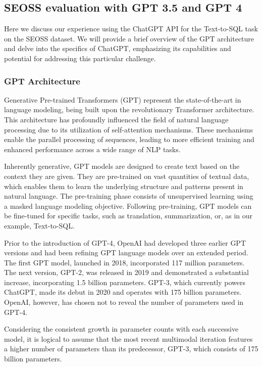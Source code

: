 \subsection{SEOSS evaluation with GPT 3.5 and GPT 4}

Here we discuss our experience using the ChatGPT API for the Text-to-SQL task on the SEOSS dataset. We will provide a brief overview of the GPT architecture and delve into the specifics of ChatGPT, emphasizing its capabilities and potential for addressing this particular challenge.
\subsubsection{GPT Architecture}

Generative Pre-trained Transformers (GPT) \cite{radford2018improving} represent the state-of-the-art in language modeling, being built upon the revolutionary Transformer architecture. This architecture has profoundly influenced the field of natural language processing due to its utilization of self-attention mechanisms. These mechanisms enable the parallel processing of sequences, leading to more efficient training and enhanced performance across a wide range of NLP tasks.

Inherently generative, GPT models are designed to create text based on the context they are given. They are pre-trained on vast quantities of textual data, which enables them to learn the underlying structure and patterns present in natural language. The pre-training phase consists of unsupervised learning using a masked language modeling objective. Following pre-training, GPT models can be fine-tuned for specific tasks, such as translation, summarization, or, as in our example, Text-to-SQL.

Prior to the introduction of GPT-4, OpenAI had developed three earlier GPT versions and had been refining GPT language models over an extended period. The first GPT model, launched in 2018, incorporated 117 million parameters. The next version, GPT-2, was released in 2019 and demonstrated a substantial increase, incorporating 1.5 billion parameters. GPT-3, which currently powers ChatGPT, made its debut in 2020 and operates with 175 billion parameters. OpenAI, however, has chosen not to reveal the number of parameters used in GPT-4.

Considering the consistent growth in parameter counts with each successive model, it is logical to assume that the most recent multimodal iteration features a higher number of parameters than its predecessor, GPT-3, which consists of 175 billion parameters.
